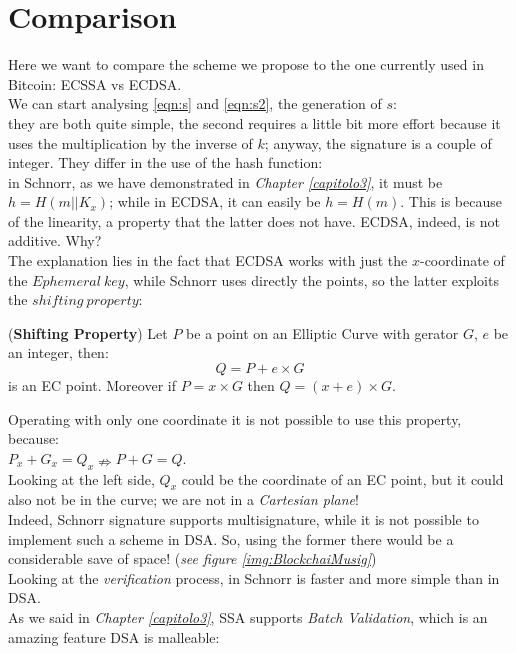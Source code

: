 \section{Comparison}
Here we want to compare the scheme we propose to the one currently used in Bitcoin: ECSSA vs ECDSA.\\
We can start analysing \eqref{eqn:s} and \eqref{eqn:s2}, the generation of $s$:\\
they are both quite simple, the second requires a little bit more effort because it uses the multiplication by the inverse of $k$; anyway, the signature is a couple of integer. They differ in the use of the hash function:\\
in Schnorr, as we have demonstrated in \textit{Chapter \eqref{capitolo3}}, it must be $h=H(m||K_{x})$; while in ECDSA, it can easily be $h=H(m)$. This is because of the linearity, a property that the latter does not have. ECDSA, indeed, is not additive. Why?\\
The explanation lies in the  fact that ECDSA works with just the $x$-coordinate of the $Ephemeral\ key$, while Schnorr uses directly the points, so the latter exploits the $shifting\ property$:
\begin{teorema}{(\textbf{Shifting Property})}
	Let $P$ be a point on an Elliptic Curve with gerator $G$, $e$ be an integer, then:
	\begin{equation*}
	Q=P+e\times G
	\end{equation*}
	is an EC point. Moreover if $P = x \times G$ then $Q=(x+e) \times G$.
\end{teorema}
Operating with only one coordinate it is not possible to use this property, because:\\
$P_{x}+G_{x}=Q_{x} \nRightarrow P+G=Q$.\\
Looking at the left side, $Q_{x}$ could be the coordinate of an EC point, but it could also not be in the curve; we are not in a \textit{Cartesian plane}!\\
Indeed, Schnorr signature supports multisignature, while it is not possible to implement such a scheme in DSA. So, using the former there would be a considerable save of space! (\textit{see figure \eqref{img:BlockchaiMusig}})\\
Looking at the \textit{verification} process, in Schnorr is faster and more simple than in DSA.\\
As we said in \textit{Chapter \eqref{capitolo3}}, SSA supports \textit{Batch Validation}, which is an amazing feature 
DSA is malleable:\\
